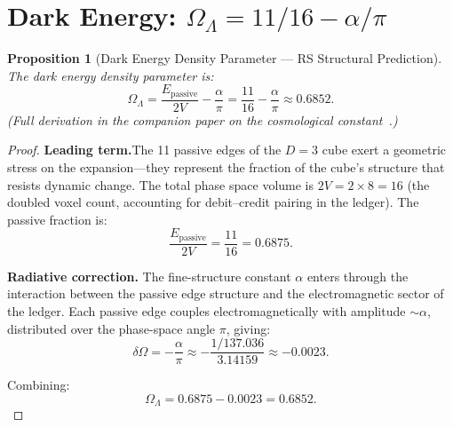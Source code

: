 \documentclass[12pt,a4paper]{article}
\newtheorem{proposition}[theorem]{Proposition}
\theoremstyle{definition}
\theoremstyle{remark}
\begin{document}
\section{Dark Energy: $\Omega_\Lambda = 11/16 - \alpha/\pi$}
\label{sec:dark-energy}

\begin{proposition}[Dark Energy Density Parameter --- RS Structural Prediction]
\label{thm:omega-lambda}
The dark energy density parameter is:
\begin{equation}
  \boxed{\Omega_\Lambda =
  \frac{E_{\mathrm{passive}}}{2V} - \frac{\alpha}{\pi}
  = \frac{11}{16} - \frac{\alpha}{\pi} \approx 0.6852.}
  \label{eq:omega-lambda}
\end{equation}
(Full derivation in the companion paper on the cosmological constant~\cite{RS_Axioms}.)
\end{proposition}

\begin{proof}
\textbf{Leading term.}\quad The 11 passive edges of the
$D = 3$ cube exert a geometric stress on the expansion---they
represent the fraction of the cube's structure that resists
dynamic change.  The total phase space volume is
$2V = 2 \times 8 = 16$ (the doubled voxel count, accounting
for debit--credit pairing in the ledger).  The passive
fraction is:
\begin{equation}
  \frac{E_{\mathrm{passive}}}{2V} = \frac{11}{16}
  = 0.6875.
\end{equation}

\textbf{Radiative correction.}\quad
The fine-structure constant $\alpha$ enters through the interaction
between the passive edge structure and the electromagnetic sector of
the ledger.  Each passive edge couples electromagnetically with
amplitude $\sim\alpha$, distributed over the phase-space angle $\pi$,
giving:
\begin{equation}
  \delta\Omega = -\frac{\alpha}{\pi}
  \approx -\frac{1/137.036}{3.14159} \approx -0.0023.
\end{equation}

Combining:
\begin{equation}
  \Omega_\Lambda = 0.6875 - 0.0023 = 0.6852.
\end{equation}
\end{proof}
\end{document}
